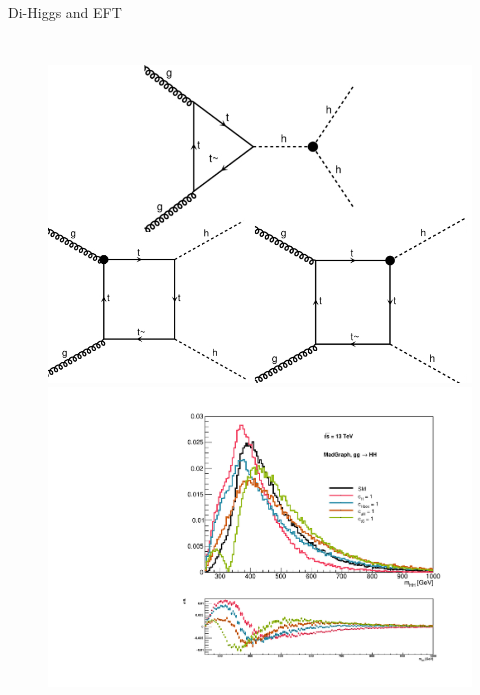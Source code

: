 \begin{frame}{Di-Higgs and EFT}
\begin{columns}
\begin{figure}
    \begin{overprint}
    \centering\includegraphics[width=1.\textwidth]{Part5/Img/EFT_feyns.jpg}
     \centering\includegraphics[width=1\textwidth]{Part5/Img/EFT_suplot.pdf}
    \end{overprint}
\end{figure}    
    
\end{columns}
    
\end{frame}

